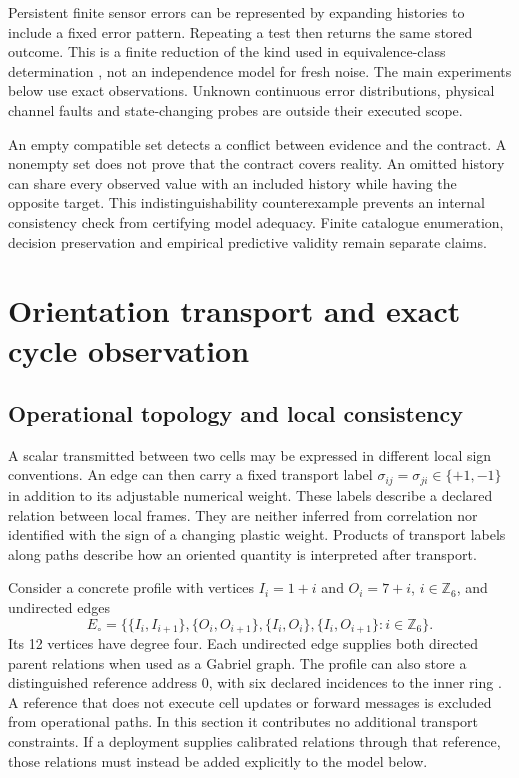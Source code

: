 \documentclass[11pt,a4paper]{article}
\theoremstyle{definition}\newtheorem{definition}[theorem]{Definition}
\begin{document}
Persistent finite sensor errors can be represented by expanding histories to include a fixed error pattern. Repeating a test then returns the same stored outcome. This is a finite reduction of the kind used in equivalence-class determination \cite{golovin2010}, not an independence model for fresh noise. The main experiments below use exact observations. Unknown continuous error distributions, physical channel faults and state-changing probes are outside their executed scope.

An empty compatible set detects a conflict between evidence and the contract. A nonempty set does not prove that the contract covers reality. An omitted history can share every observed value with an included history while having the opposite target. This indistinguishability counterexample prevents an internal consistency check from certifying model adequacy. Finite catalogue enumeration, decision preservation and empirical predictive validity remain separate claims.

\section{Orientation transport and exact cycle observation}\label{sec:orientation}
\subsection{Operational topology and local consistency}
A scalar transmitted between two cells may be expressed in different local sign conventions. An edge can then carry a fixed transport label $\sigma_{ij}=\sigma_{ji}\in\{+1,-1\}$ in addition to its adjustable numerical weight. These labels describe a declared relation between local frames. They are neither inferred from correlation nor identified with the sign of a changing plastic weight. Products of transport labels along paths describe how an oriented quantity is interpreted after transport.

Consider a concrete profile with vertices $I_i=1+i$ and $O_i=7+i$, $i\in\mathbb Z_6$, and undirected edges
\begin{equation}
 E_\circ=\{\{I_i,I_{i+1}\},\{O_i,O_{i+1}\},
                 \{I_i,O_i\},\{I_i,O_{i+1}\}:i\in\mathbb Z_6\}.
 \label{eq:operationalgraph}
\end{equation}
Its 12 vertices have degree four. Each undirected edge supplies both directed parent relations when used as a Gabriel graph. The profile can also store a distinguished reference address $0$, with six declared incidences to the inner ring \cite{klemmtpnr2026}. A reference that does not execute cell updates or forward messages is excluded from operational paths. In this section it contributes no additional transport constraints. If a deployment supplies calibrated relations through that reference, those relations must instead be added explicitly to the model below.
\end{document}

